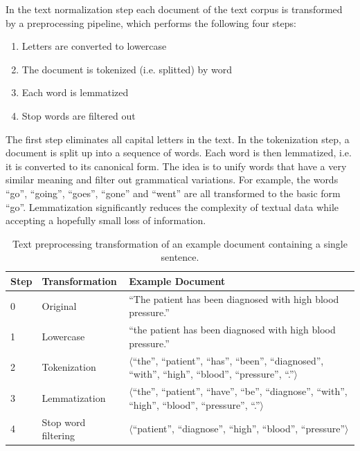 In the text normalization step each document of the text corpus is transformed by a preprocessing pipeline, which performs the following four steps:
\begin{enumerate} 
	\item Letters are converted to lowercase
	\item The document is tokenized (i.e. splitted) by word
	\item Each word is lemmatized
	\item Stop words are filtered out
\end{enumerate}
The first step eliminates all capital letters in the text.
In the tokenization step, a document is split up into a sequence of words.
Each word is then lemmatized, i.e. it is converted to its canonical form.
The idea is to unify words that have a very similar meaning and filter out grammatical variations.
For example, the words   \enquote{go}, \enquote{going}, \enquote{goes}, \enquote{gone} and   \enquote{went} are all transformed to the basic form   \enquote{go}.
Lemmatization significantly reduces the complexity of textual data while accepting a hopefully small loss of information.

\begin{table}[!htbp]
	\begin{tabularx}{\textwidth}{l l p{9.8cm}}
		\toprule
		\textbf{Step} & \textbf{Transformation} & \textbf{Example Document}                                                       \\ \midrule
		0             & Original       &   \enquote{The patient has been diagnosed with high blood pressure.} \\
		1             & Lowercase               &   \enquote{the patient has been diagnosed with high blood pressure.} \\
		2 & Tokenization  & $\langle$\enquote{the}, \enquote{patient}, \enquote{has}, \enquote{been}, \enquote{diagnosed}, \enquote{with}, \enquote{high}, \enquote{blood}, \enquote{pressure}, \enquote{.}$\rangle$ \\
		3 & Lemmatization & $\langle$\enquote{the}, \enquote{patient}, \enquote{have},  \enquote{be}, \enquote{diagnose}, \enquote{with},  \enquote{high}, \enquote{blood}, \enquote{pressure}, \enquote{.}$\rangle$  \\
		4             & Stop word filtering     & $\langle$\enquote{patient}, \enquote{diagnose}, \enquote{high}, \enquote{blood}, \enquote{pressure}$\rangle$ \\ \bottomrule
	\end{tabularx}
	\caption[Text preprocessing transformation of an example document]{Text preprocessing transformation of an example document containing a single sentence.}
	\label{tab:text-preprocessing}
\end{table}

